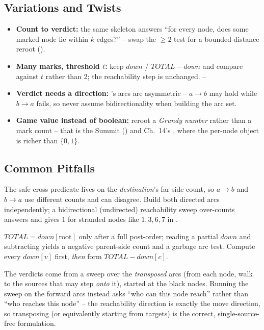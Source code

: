 \subsection{Variations and Twists}

\begin{itemize}[nosep]
  \item \textbf{Count to verdict:} the same skeleton answers ``for every node,
        does some marked node lie within $k$ edges?'' -- swap the $\ge2$ test for
        a bounded-distance reroot (). \hfill{}
  \item \textbf{Many marks, threshold $t$:} keep $\mathit{down}$ / $\mathit{TOTAL}
        -\mathit{down}$ and compare against $t$ rather than $2$; the reachability
        step is unchanged. \hfill{}--
  \item \textbf{Verdict needs a direction:} 's
        arcs are asymmetric -- $a\!\to\!b$ may hold while $b\!\to\!a$ fails, so
        never assume bidirectionality when building the arc set. \hfill{}
  \item \textbf{Game value instead of boolean:} reroot a \emph{Grundy number}
        rather than a mark count -- that is the Summit () and
        Ch.~14's , where the per-node object is richer
        than $\{0,1\}$. \hfill{}
\end{itemize}

\subsection{Common Pitfalls}

\begin{warningbox}
The safe-cross predicate lives on the \emph{destination}'s far-side count, so
$a\!\to\!b$ and $b\!\to\!a$ use different counts and can disagree. Build both
directed arcs independently; a bidirectional (undirected) reachability sweep
over-counts answers and gives $1$ for stranded nodes like $1,3,6,7$ in
.
\end{warningbox}
\begin{warningbox}
$\mathit{TOTAL}=\mathit{down}[\text{root}]$ only after a full post-order; reading a
partial $\mathit{down}$ and subtracting yields a negative parent-side count and a
garbage arc test. Compute every $\mathit{down}[v]$ first, \emph{then} form
$\mathit{TOTAL}-\mathit{down}[c]$.
\end{warningbox}
\begin{warningbox}
The verdicts come from a sweep over the \emph{transposed} arcs (from each node,
walk to the sources that may step \emph{onto} it), started at the black nodes.
Running the sweep on the forward arcs instead asks ``who can this node reach''
rather than ``who reaches this node'' -- the reachability direction is exactly the
move direction, so transposing (or equivalently starting from targets) is the
correct, single-source-free formulation.
\end{warningbox}

